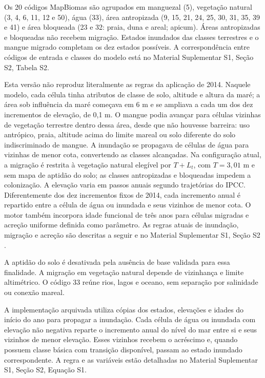 \documentclass[12pt,a4paper]{article}
\begin{document}
Os 20 códigos MapBiomas são agrupados em manguezal (5), vegetação natural (3, 4, 6, 11, 12 e 50), água (33), área antropizada (9, 15, 21, 24, 25, 30, 31, 35, 39 e 41) e área bloqueada (23 e 32: praia, duna e areal; apicum). Áreas antropizadas e bloqueadas não recebem migração. Estados inundados das classes terrestres e o mangue migrado completam os dez estados possíveis. A correspondência entre códigos de entrada e classes do modelo está no Material Suplementar S1, Seção S2, Tabela S2.

Esta versão não reproduz literalmente as regras da aplicação de 2014. Naquele modelo, cada célula tinha atributos de classe de solo, altitude e altura da maré; a área sob influência da maré começava em 6 m e se ampliava a cada um dos dez incrementos de elevação, de 0,1 m. O mangue podia avançar para células vizinhas de vegetação terrestre dentro dessa área, desde que não houvesse barreira: uso antrópico, praia, altitude acima do limite mareal ou solo diferente do solo indiscriminado de mangue. A inundação se propagava de células de água para vizinhas de menor cota, convertendo as classes alcançadas. Na configuração atual, a migração é restrita à vegetação natural elegível por $T+L_t$, com $T=3,01$ m e sem mapa de aptidão do solo; as classes antropizadas e bloqueadas impedem a colonização. A elevação varia em passos anuais segundo trajetórias do IPCC. Diferentemente dos dez incrementos fixos de 2014, cada incremento anual é repartido entre a célula de água ou inundada e seus vizinhos de menor cota. O motor também incorpora idade funcional de três anos para células migradas e acreção uniforme definida como parâmetro. As regras atuais de inundação, migração e acreção são descritas a seguir e no Material Suplementar S1, Seção S2 \citep{bezerra2014,studio2026}.

A aptidão do solo é desativada pela ausência de base validada para essa finalidade. A migração em vegetação natural depende de vizinhança e limite altimétrico. O código 33 reúne rios, lagos e oceano, sem separação por salinidade ou conexão mareal.

A implementação arquivada \citep{studio2026} utiliza cópias dos estados, elevações e idades do início do ano para propagar a inundação. Cada célula de água ou inundada com elevação não negativa reparte o incremento anual do nível do mar entre si e seus vizinhos de menor elevação. Esses vizinhos recebem o acréscimo e, quando possuem classe básica com transição disponível, passam ao estado inundado correspondente. A regra e as variáveis estão detalhadas no Material Suplementar S1, Seção S2, Equação S1.
\end{document}
